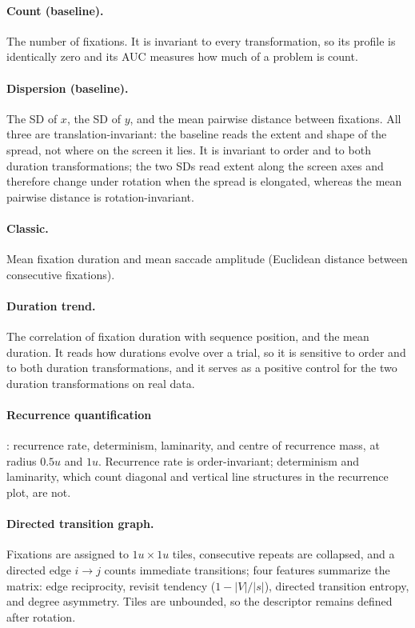 \documentclass[11pt]{article}
\begin{document}
\paragraph{Count (baseline).} The number of fixations. It is invariant to every transformation, so its profile is identically zero and its AUC measures how much of a problem is count.

\paragraph{Dispersion (baseline).} The SD of $x$, the SD of $y$, and the mean pairwise distance between fixations. All three are translation-invariant: the baseline reads the extent and shape of the spread, not where on the screen it lies. It is invariant to order and to both duration transformations; the two SDs read extent along the screen axes and therefore change under rotation when the spread is elongated, whereas the mean pairwise distance is rotation-invariant.

\paragraph{Classic.} Mean fixation duration and mean saccade amplitude (Euclidean distance between consecutive fixations).

\paragraph{Duration trend.} The correlation of fixation duration with sequence position, and the mean duration. It reads how durations evolve over a trial, so it is sensitive to order and to both duration transformations, and it serves as a positive control for the two duration transformations on real data.

\paragraph{Recurrence quantification} \citep{anderson2013recurrence}: recurrence rate, determinism, laminarity, and centre of recurrence mass, at radius $0.5u$ and $1u$. Recurrence rate is order-invariant; determinism and laminarity, which count diagonal and vertical line structures in the recurrence plot, are not.

\paragraph{Directed transition graph.} Fixations are assigned to $1u\times1u$ tiles, consecutive repeats are collapsed, and a directed edge $i\to j$ counts immediate transitions; four features summarize the matrix: edge reciprocity, revisit tendency ($1 - |V|/|s|$), directed transition entropy, and degree asymmetry. Tiles are unbounded, so the descriptor remains defined after rotation.
\end{document}
